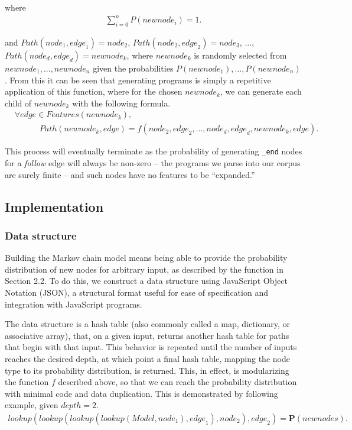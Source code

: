 \documentclass{article}
\begin{document}
where \begin{align*}
\sum\limits_{i = 0}^n P({newnode_i}) = 1.
\end{align*}

\noindent and ${Path}({node}_1, {edge}_1) = {node}_2$, ${Path}({node}_2, {edge}_2) = {node}_3$, ..., ${Path}({node}_d, {edge}_d) = {newnode}_k$, where ${newnode}_k$ is randomly selected from ${newnode}_1, ..., {newnode}_n$ given the probabilities $P({newnode_1}), ..., P({newnode_n})$. From this it can be seen that generating programs is simply a repetitive application of this function, where for the chosen ${newnode}_k$, we can generate each child of ${newnode}_k$ with the following formula. \begin{align*} &\forall {edge} \in {Features}({newnode}_k), \\
& \hspace{3em} {Path}({newnode}_k, {edge}) = f({node}_2, {edge}_2, ..., {node}_{d}, {edge}_{d}, {newnode}_k, {edge}).
\end{align*}

This process will eventually terminate as the probability of generating {\tt \_end} nodes for a \emph{follow} edge will always be non-zero -- the programs we parse into our corpus are surely finite -- and such nodes have no features to be ``expanded.''

\subsection{Implementation}

\subsubsection{Data structure}

Building the Markov chain model means being able to provide the probability distribution of new nodes for arbitrary input,
as described by the function in Section 2.2. To do this, we construct a data structure using JavaScript Object Notation (JSON),
a structural format useful for ease of specification and integration with JavaScript programs.

The data structure is a hash table (also commonly called a map, dictionary, or associative array), that, on a given input, returns another hash table for paths that begin with that input. This behavior is repeated until the number of inputs reaches the desired depth, at which point a final hash table, mapping the node type to its probability distribution, is returned. This, in effect, is modularizing the function $f$ described above, so that we can reach the probability distribution with minimal code and data duplication. This is demonstrated by following example, given  ${depth} = 2$. \begin{align*}
lookup(lookup(lookup(lookup({Model}, {node}_1), {edge}_1), {node}_2), {edge}_2) = \textbf{P}({newnodes}).
\end{align*}
\end{document}
